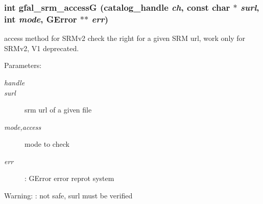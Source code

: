 \subsubsection{\setlength{\rightskip}{0pt plus 5cm}int gfal\_\-srm\_\-access\-G (catalog\_\-handle {\em ch}, const char $\ast$ {\em surl}, int {\em mode}, GError $\ast$$\ast$ {\em err})}\label{gfal__common__srm__access_8h_fb067c53506a97a400866960ba75446c}


access method for SRMv2 check the right for a given SRM url, work only for SRMv2, V1 deprecated. 

\begin{Desc}
\item[Parameters:]
\begin{description}
\item[{\em handle}]\item[{\em surl}]srm url of a given file \item[{\em mode,access}]mode to check \item[{\em err}]: GError error reprot system \end{description}
\end{Desc}
\begin{Desc}
\item[Warning:]: not safe, surl must be verified \end{Desc}
